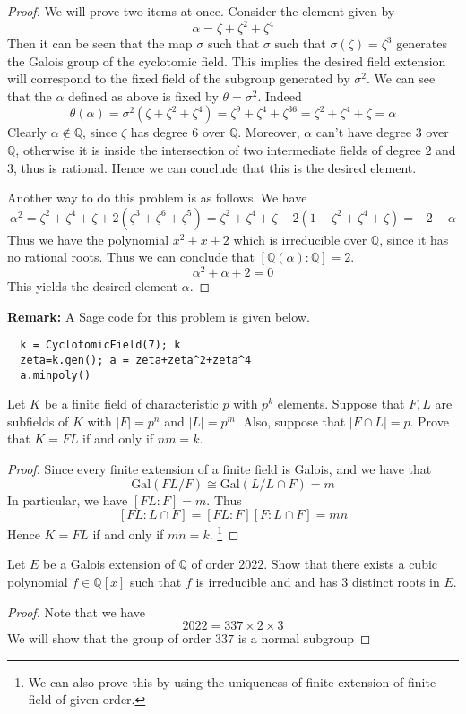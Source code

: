 \documentclass[11pt,letterpaper]{article}
\newcounter{problem}
\DeclareMathOperator{\1}{\mathbbm{1}}
\begin{document}
\begin{proof}
  We will prove two items at once. Consider the element given by
  \[\alpha = \zeta + \zeta^2+\zeta^4\]
  Then it can be seen that the map $\sigma$ such that $\sigma$ such that $\sigma(\zeta) = \zeta^3$ generates the Galois group of the cyclotomic field. This implies the desired field extension will correspond
  to the fixed field of the subgroup generated by $\sigma^2$. We can see that the $\alpha$ defined as above
  is fixed by $\theta=\sigma^2$. Indeed
  \[\theta(\alpha) = \sigma^2(\zeta + \zeta^2+\zeta^4) = \zeta^9 + \zeta^4+\zeta^{36} = \zeta^2 + \zeta^4+\zeta = \alpha\]
  Clearly $\alpha \notin \mathbb{Q}$, since $\zeta$ has degree $6$ over $\mathbb{Q}$. Moreover, $\alpha$ can't have degree $3$ over $\mathbb{Q}$,
  otherwise it is inside the intersection of two intermediate fields of degree $2$ and $3$, thus is rational.
  Hence we can conclude that this is the desired element.

  Another way  to do this problem is as follows. We have
  \[\alpha^2 = \zeta^2+\zeta^4+\zeta + 2(\zeta^3+\zeta^6+\zeta^5)=\zeta^2+\zeta^4+\zeta-2(1+\zeta^2+\zeta^4+\zeta)=-2-\alpha\]
  Thus we have the polynomial $x^2+x+2$ which is irreducible over $\mathbb{Q}$, since it has no rational roots. Thus we can conclude that $[\mathbb{Q}(\alpha):\mathbb{Q}] = 2$.
  \[\alpha^2 + \alpha + 2 = 0\]
  This yields the desired element $\alpha$.
\end{proof}
\textbf{Remark:} A Sage code for this problem is given below.
\begin{verbatim}
  k = CyclotomicField(7); k 
  zeta=k.gen(); a = zeta+zeta^2+zeta^4
  a.minpoly()
\end{verbatim}
\begin{exercise}
  Let \( K \) be a finite field of characteristic \( p \) with \( p^k \) elements. Suppose that \( F, L \) are subfields of \( K \) with \( |F| = p^n \) and \( |L| = p^m \). Also, suppose that \( |F \cap L| = p \). Prove that \( K = FL \) if and only if \( nm = k \).
\end{exercise}
\begin{proof}
  Since every finite extension of a finite field is Galois, and we have that
  \[\text{Gal}(FL/F) \cong \text{Gal}(L/L\cap F) = m\]
  In particular, we have $[FL:F] = m$. Thus
  \[[FL:L \cap F] = [FL:F][F:L\cap F ] = mn\]
  Hence $K = FL$ if and only if $mn = k$.  \footnote{  We can also prove this by using the uniqueness of finite extension of finite field of given order.}
\end{proof}
\begin{exercise}
  Let $E$ be a Galois extension of $\mathbb{Q}$ of order $2022$. Show that there exists 
  a cubic polynomial $f \in \mathbb{Q}[x]$ such that $f$ is irreducible and and has 3 distinct roots in $E$.
\end{exercise}
\begin{proof}
Note that we have 
\[2022 = 337 \times 2 \times 3\]
We will show that  the group of order $337$ is a normal subgroup
\end{proof}
\end{document}

